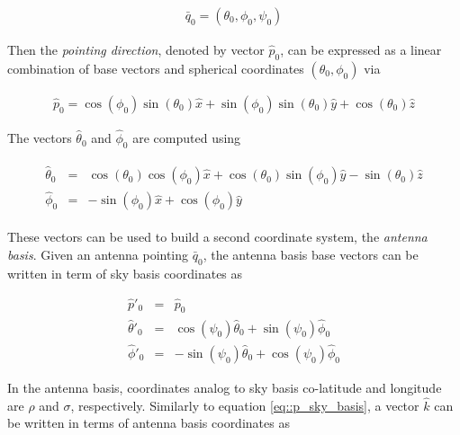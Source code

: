 \documentclass[a4paper,fleqn]{cas-dc}\sloppy
\begin{document}
	\begin{equation}
	\begin{aligned}
	\bar{q}_0= (\theta_0,\phi_0,\psi_0)
	\end{aligned}
	\end{equation}
	
	Then the \textsl{pointing direction}, denoted by vector $\hat{p}_0$, can be expressed as a linear combination of base vectors and spherical coordinates $(\theta_0,\phi_0)$ via
	
	\begin{equation}
	\begin{aligned}
	\hat{p}_0 = \cos(\phi_0)\sin(\theta_0)\hat{x} + \sin(\phi_0)\sin(\theta_0) \hat{y} + \cos(\theta_0) \hat{z}
	\end{aligned}
	\label{eq::p_sky_basis}
	\end{equation}
	
	The vectors $\hat{\theta}_0$ and $\hat{\phi}_0$ are computed using
	
	\begin{eqnarray}
	\begin{aligned}
	\hat{\theta}_0 &=&  \cos(\theta_0) \cos(\phi_0) \hat{x} + \cos(\theta_0)\sin(\phi_0) \hat{y} - \sin(\theta_0) \hat{z} \\
	\hat{\phi}_0   &=&              -\sin(\phi_0) \hat{x} +             \cos(\phi_0) \hat{y}
	\end{aligned}
	\label{eq::tangent_sky_basis}
	\end{eqnarray}
	
	These vectors can be used to build a second coordinate system, the \textsl{antenna basis}. Given an antenna pointing $\bar{q}_0$, the antenna basis base vectors can be written in term of sky basis coordinates as 
	
	\begin{eqnarray}
	\hat{p}'_0      &=&  \hat{p}_0 \\
	\hat{\theta}'_0 &=&  \cos(\psi_0)\hat{\theta}_0 + \sin(\psi_0)\hat{\phi}_0 \\
	\hat{\phi}'_0   &=& -\sin(\psi_0)\hat{\theta}_0 + \cos(\psi_0)\hat{\phi}_0
	\label{eq::antenna_base_vectors}
	\end{eqnarray}
	
	In the antenna basis, coordinates analog to sky basis co-latitude and longitude are $\rho$ and $\sigma$, respectively. Similarly to equation \ref{eq::p_sky_basis}, a vector $\hat{k}$ can be written in terms of antenna basis coordinates as
	
\end{document}
